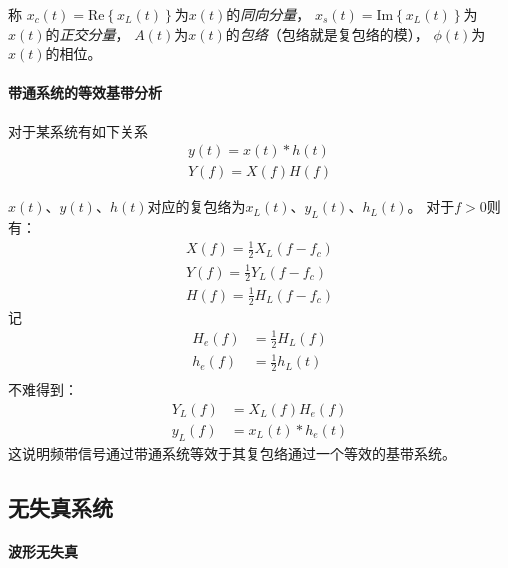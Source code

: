     称
    $x_c(t)=\text{Re}\left\{x_L(t)\right\}$为$x(t)$的\emph{同向分量}，
    $x_s(t)=\text{Im}\left\{x_L(t)\right\}$为$x(t)$的\emph{正交分量}，
    $A(t)$为$x(t)$的\emph{包络}（包络就是复包络的模），
    $\phi(t)$为$x(t)$的相位。

    \paragraph{带通系统的等效基带分析}\mbox{}

    对于某系统有如下关系
    \begin{equation}
        \begin{split}
            y(t)=x(t)*h(t)\\
            Y(f)=X(f)H(f)
        \end{split}
    \end{equation}

    $x(t)$、$y(t)$、$h(t)$对应的复包络为$x_L(t)$、$y_L(t)$、$h_L(t)$。
    对于$f>0$则有：
    \begin{equation}
        \begin{split}
            X(f)=\frac12X_L(f-f_c)\\
            Y(f)=\frac12Y_L(f-f_c)\\
            H(f)=\frac12H_L(f-f_c)
        \end{split}
    \end{equation}
    记
    \begin{equation}
        \begin{split}
            H_e(f)&=\frac12H_L(f)\\
            h_e(f)&=\frac12h_L(t)\\
        \end{split}
    \end{equation}
    不难得到：
    \begin{equation}
        \begin{split}
            Y_L(f)&=X_L(f)H_e(f)\\
            y_L(f)&=x_L(t)*h_e(t)
        \end{split}
    \end{equation}
    这说明频带信号通过带通系统等效于其复包络通过一个等效的基带系统。

\subsection{无失真系统}
    \paragraph{波形无失真}\mbox{}

